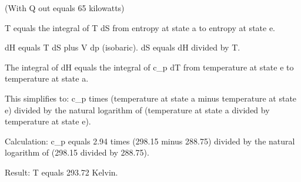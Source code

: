 (With Q out equals 65 kilowatts)  

T equals the integral of T dS from entropy at state a to entropy at state e.  

dH equals T dS plus V dp (isobaric).  
dS equals dH divided by T.  

The integral of dH equals the integral of c_p dT from temperature at state e to temperature at state a.  

This simplifies to:  
c_p times (temperature at state a minus temperature at state e) divided by the natural logarithm of (temperature at state a divided by temperature at state e).  

Calculation:  
c_p equals 2.94 times (298.15 minus 288.75) divided by the natural logarithm of (298.15 divided by 288.75).  

Result: T equals 293.72 Kelvin.